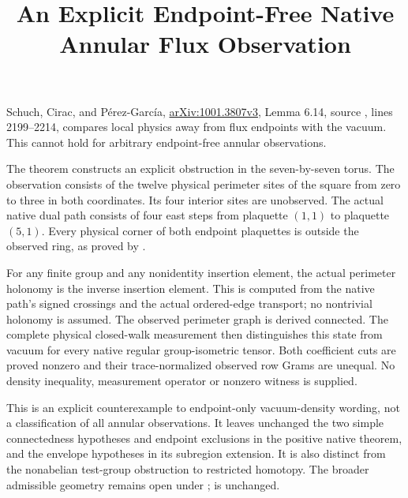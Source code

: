 \documentclass{article}
\title{An Explicit Endpoint-Free Native Annular Flux Observation}
\author{}
\date{}
\begin{document}
\maketitle
{}

Schuch, Cirac, and P\'erez-Garc\'ia,
\href{https://arxiv.org/abs/1001.3807v3}{arXiv:1001.3807v3},
Lemma 6.14, source , lines 2199--2214,
compares local physics away from flux endpoints with the vacuum. This
cannot hold for arbitrary endpoint-free annular observations.

The theorem
constructs an explicit obstruction in the seven-by-seven torus. The
observation consists of the twelve physical perimeter sites of the square
from zero to three in both coordinates. Its four interior sites are
unobserved. The actual native dual path consists of four east steps from
plaquette $(1,1)$ to plaquette $(5,1)$. Every physical corner of both
endpoint plaquettes is outside the observed ring, as proved by
.

For any finite group and any nonidentity insertion element, the actual
perimeter holonomy is the inverse insertion element. This is computed
from the native path's signed crossings and the actual ordered-edge
transport; no nontrivial holonomy is assumed. The observed perimeter
graph is derived connected. The complete physical closed-walk measurement
then distinguishes this state from vacuum for every native regular
group-isometric tensor. Both coefficient cuts are proved nonzero and their
trace-normalized observed row Grams are unequal. No density inequality,
measurement operator or nonzero witness is supplied.

This is an explicit counterexample to endpoint-only vacuum-density wording,
not a classification of all annular observations. It leaves unchanged the
two simple connectedness hypotheses and endpoint exclusions in the positive
native theorem, and the envelope hypotheses in its subregion extension.
It is also distinct from the nonabelian test-group obstruction to restricted
homotopy. The broader admissible geometry remains open under
;  is unchanged.
\end{document}
